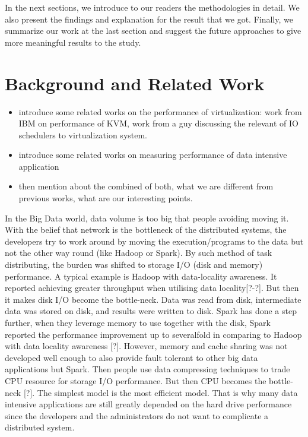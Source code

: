 \documentclass{acmsig}
\begin{document}
In the next sections, we introduce to our readers the methodologies in detail. We also present the findings and explanation for the result that we got. Finally, we summarize our work at the last section and suggest the future approaches to give more meaningful results to the study.

\section{Background and Related Work}
\begin{itemize}
  \item introduce some related works on the performance of virtualization: work from IBM on performance of KVM, work from a guy discussing the relevant of IO schedulers to virtualization system.
  \item introduce some related works on measuring performance of data intensive application
 \item then mention about the combined of both, what we are different from previous works, what are our interesting points.
\end{itemize}

In the Big Data world, data volume is too big that people avoiding moving it. With the belief that network is the bottleneck of the distributed systems, the developers try to work around by moving the execution/programs to the data but not the other way round (like Hadoop or Spark). By such method of task distributing, the burden was shifted to storage I/O (disk and memory) performance. A typical example is Hadoop with data-locality awareness. It reported achieving greater throughput when utilising data locality[?-?]. But then it makes disk I/O become the bottle-neck. Data was read from disk, intermediate data was stored on disk, and results were written to disk. Spark has done a step further, when they leverage memory to use together with the disk, Spark reported the performance improvement up to severalfold in comparing to Hadoop with data locality awareness [?]. However, memory and cache sharing was not developed well enough to also provide fault tolerant to other big data applications but Spark. Then people use data compressing techniques to trade CPU resource for storage I/O performance. But then CPU becomes the bottle-neck [?]. The simplest model is the most efficient model. That is why many data intensive applications are still greatly depended on the hard drive performance since the developers and the administrators do not want to complicate a distributed system.
\end{document}
